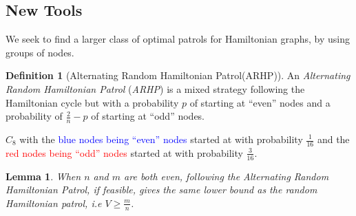 \documentclass[a4paper,10pt]{article}
\newtheorem{lemma}[theorem]{Lemma}
\theoremstyle{definition}
\newtheorem{definition}[theorem]{Definition}
\theoremstyle{definition}
\theoremstyle{remark}
\theoremstyle{definition}
\begin{document}
\subsection{New Tools}
We seek to find a larger class of optimal patrols for Hamiltonian graphs, by using groups of nodes.

\begin{definition}[Alternating Random Hamiltonian Patrol(ARHP)]
An \textit{Alternating Random Hamiltonian Patrol} (\textit{ARHP}) is a mixed strategy following the Hamiltonian cycle but with a probability $p$ of starting at ``even'' nodes and a probability of $\frac{2}{n}-p$ of starting at ``odd'' nodes.
\end{definition}

\begin{examplefigure}
\begin{center}
\end{center}
\caption{ $C_{8}$ with the \textcolor{blue}{blue nodes being ``even'' nodes} started at with probability $\frac{1}{16}$ and the \textcolor{red}{red nodes being ``odd'' nodes} started at with probability $\frac{3}{16}$.}
\end{examplefigure}

\begin{lemma}
When $n$ and $m$ are both even, following the Alternating Random Hamiltonian Patrol, if feasible, gives the same lower bound as the random Hamiltonian patrol, i.e $V \geq \frac{m}{n}$.
\end{lemma}
\end{document}

